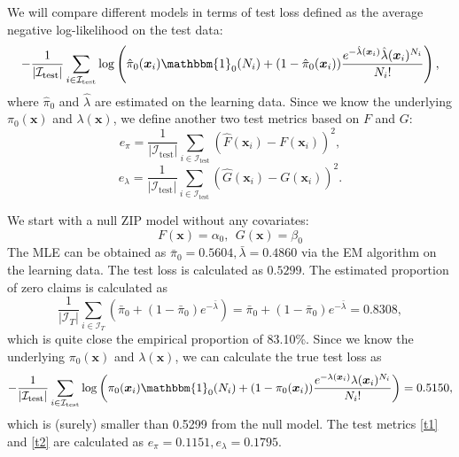 \documentclass[11pt]{article}
\numberwithin{equation}{section}
\def\bx{\boldsymbol{x}}
\begin{document}
We will compare different models in terms of test loss defined as the average negative log-likelihood on the test data:
\begin{equation}\label{zip-test-loss}
	-\frac{1}{|\mathcal{I}_\text{test}|}\sum_{i\in\mathcal{I}_\text{test}}\log \left(\hat{\pi}_0(\bx_i)\mathbbm{1}_0(N_i) + 
	(1-\hat{\pi}_0(\bx_i))\frac{e^{-\hat{\lambda}(\bx_i)}\hat{\lambda}(\bx_i)^{N_i}}{N_i!}\right),
\end{equation} 
where $\hat{\pi}_0$ and $\hat{\lambda}$ are estimated on the learning data. 
Since we know the underlying $\pi_0(\bx)$ and $\lambda(\bx)$, we define another two test metrics based on $F$ and $G$:
\begin{equation}\label{t1}
	e_\pi=\frac{1}{|\mathcal{I}_\text{test}|}\sum_{i\in\mathcal{I}_\text{test}}(\hat{F}(\bx_i)-F(\bx_i))^2,
\end{equation}
\begin{equation}\label{t2}
	e_\lambda=\frac{1}{|\mathcal{I}_\text{test}|}\sum_{i\in\mathcal{I}_\text{test}}(\hat{G}(\bx_i)-G(\bx_i))^2.
\end{equation}


We start with a null ZIP model without any covariates:
\begin{equation}\label{zip-null}
	F(\bx)=\alpha_0, ~~G(\bx)=\beta_0 
\end{equation}
The MLE can be obtained as $\bar{\pi}_0=0.5604, \bar{\lambda}=0.4860$ via the EM algorithm on the learning data.
The test loss is calculated as $0.5299$. 
The estimated proportion of zero claims is calculated as 
$$\frac{1}{|\mathcal{I}_T|}\sum_{i\in\mathcal{I}_T}\left(\bar{\pi}_0+(1-\bar{\pi}_0)e^{-\bar{\lambda}}\right)=\bar{\pi}_0+(1-\bar{\pi}_0)e^{-\bar{\lambda}}=0.8308,$$
which is quite close the empirical proportion of 83.10\%.
Since we know the underlying $\pi_0(\bx)$ and $\lambda(\bx)$, we can calculate the true test loss as 
\begin{equation}
	-\frac{1}{|\mathcal{I}_\text{test}|}\sum_{i\in\mathcal{I}_\text{test}}\log \left({\pi}_0(\bx_i)\mathbbm{1}_0(N_i) + 
	(1-{\pi}_0(\bx_i))\frac{e^{-{\lambda}(\bx_i)}{\lambda}(\bx_i)^{N_i}}{N_i!}\right)=0.5150,
\end{equation}   
which is (surely) smaller than 0.5299 from the null model.
The test metrics \eqref{t1} and \eqref{t2} are calculated as $e_\pi=0.1151, e_\lambda=0.1795$.
\end{document}
